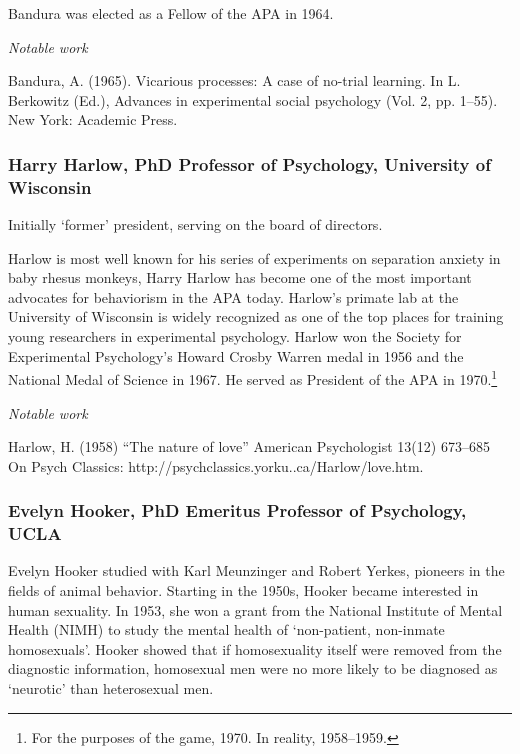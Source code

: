 Bandura was elected as a Fellow of the APA in 1964.

\emph{Notable work}

Bandura, A. (1965). Vicarious processes: A case of no-trial learning. In L. Berkowitz (Ed.), Advances in experimental social psychology (Vol. 2, pp. 1--55). New York: Academic Press.

\subsubsection{Harry Harlow, PhD Professor of Psychology, University of Wisconsin}
\label{harryharlowphdprofessorofpsychologyuniversityofwisconsin}

Initially `former' president, serving on the board of directors.

Harlow is most well known for his series of experiments on separation anxiety in baby rhesus monkeys, Harry Harlow has become one of the most important advocates for behaviorism in the APA today. Harlow's primate lab at the University of Wisconsin is widely recognized as one of the top places for training young researchers in experimental psychology. Harlow won the Society for Experimental Psychology's Howard Crosby Warren medal in 1956 and the National Medal of Science in 1967. He served as President of the APA in 1970.\footnote{For the purposes of the game, 1970. In reality, 1958--1959.} 

\emph{Notable work}

Harlow, H. (1958) ``The nature of love'' American Psychologist 13(12) 673--685 On Psych Classics: http:\slash \slash psychclassics.yorku..ca\slash Harlow\slash love.htm.

\subsubsection{Evelyn Hooker, PhD Emeritus Professor of Psychology, UCLA}
\label{evelynhookerphdemeritusprofessorofpsychologyucla}

Evelyn Hooker studied with Karl Meunzinger and Robert Yerkes, pioneers in the fields of animal behavior. Starting in the 1950s, Hooker became interested in human sexuality. In 1953, she won a grant from the National Institute of Mental Health (NIMH) to study the mental health of `non-patient, non-inmate homosexuals'. Hooker showed that if homosexuality itself were removed from the diagnostic information, homosexual men were no more likely to be diagnosed as `neurotic' than heterosexual men.

